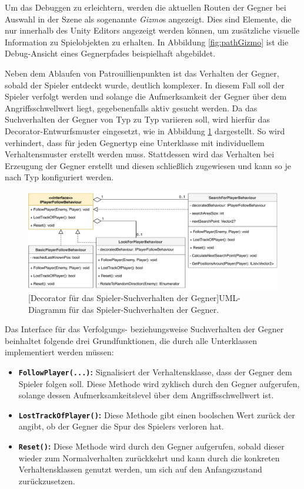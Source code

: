  Um das Debuggen zu erleichtern, werden die aktuellen Routen der Gegner bei Auswahl in der Szene als sogenannte \textit{Gizmo}s angezeigt. Dies sind Elemente, die nur innerhalb des Unity Editors angezeigt werden können, um zusätzliche visuelle Information zu Spielobjekten zu erhalten. In Abbildung \ref{fig:pathGizmo} ist die Debug-Ansicht eines Gegnerpfades beispielhaft abgebildet.

Neben dem Ablaufen von Patrouillienpunkten ist das Verhalten der Gegner, sobald der Spieler entdeckt wurde, deutlich komplexer. In diesem Fall soll der Spieler verfolgt werden und solange die Aufmerksamkeit der Gegner über dem Angriffsschwellwert liegt, gegebenenfalls aktiv gesucht werden. Da das Suchverhalten der Gegner von Typ zu Typ variieren soll, wird hierfür das Decorator-Entwurfsmuster \cite[175]{Design_Patterns} eingesetzt, wie in Abbildung \ref{fig:followBehaviourUML} dargestellt. So wird verhindert, dass für jeden Gegnertyp eine Unterklasse mit individuellem Verhaltensmuster erstellt werden muss. Stattdessen wird das Verhalten bei Erzeugung der Gegner erstellt und diesen schließlich zugewiesen und kann so je nach Typ konfiguriert werden.

\begin{figure}[h]
 \centering
 \includegraphics[width=1\linewidth]{diagrams/Player_Follow_Behaviour_UML.pdf}
 [Decorator für das Spieler-Suchverhalten der Gegner]{UML-Diagramm für das Spieler-Suchverhalten der Gegner.}
	\label{fig:followBehaviourUML}
\end{figure}

Das Interface für das Verfolgungs- beziehungsweise Suchverhalten der Gegner beinhaltet folgende drei Grundfunktionen, die durch alle Unterklassen implementiert werden müssen:

\begin{itemize}
	\item\textbf{\texttt{FollowPlayer(...)}:} Signalisiert der Verhaltensklasse, dass der Gegner dem Spieler folgen soll. Diese Methode wird zyklisch durch den Gegner aufgerufen, solange dessen Aufmerksamkeitslevel über dem Angriffsschwellwert ist.
	\item\textbf{\texttt{LostTrackOfPlayer()}:} Diese Methode gibt einen boolschen Wert zurück der angibt, ob der Gegner die Spur des Spielers verloren hat.
	\item\textbf{\texttt{Reset()}:} Diese Methode wird durch den Gegner aufgerufen, sobald dieser wieder zum Normalverhalten zurückkehrt und kann durch die konkreten Verhaltensklassen genutzt werden, um sich auf den Anfangszustand zurückzusetzen.
\end{itemize}

